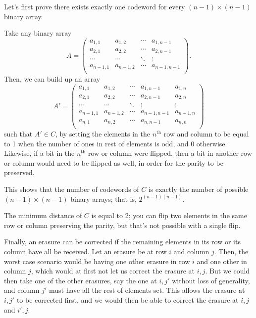 Let's first prove there exists exactly one codeword for every $(n-1)\times(n-1)$ binary array.

Take any binary array
\[A = \begin{pmatrix}
	a_{1,1} & a_{1,2} & \cdots & a_{1,n-1} \\
	a_{2,1} & a_{2,2} & \cdots & a_{2,n-1} \\
	\cdots & \cdots & \ddots & \vdots \\
	a_{n-1,1} & a_{n-1,2} & \cdots & a_{n-1,n-1} \\
\end{pmatrix}.\]
Then, we can build up an array
\[A' = \begin{pmatrix}
	a_{1,1} & a_{1,2} & \cdots & a_{1,n-1} & a_{1,n} \\
	a_{2,1} & a_{2,2} & \cdots & a_{2,n-1} & a_{2,n}\\
	\cdots & \cdots & \ddots & \vdots & \vdots \\
	a_{n-1,1} & a_{n-1,2} & \cdots & a_{n-1,n-1} & a_{n-1,n} \\
	a_{n,1} & a_{n,2} & \cdots & a_{n,n-1} & a_{n,n} \\
\end{pmatrix}\]
such that $A' \in C$, by setting the elements in the $n^\textrm{th}$ row and column to be equal to 1 when the number of ones in rest of elements is odd, and 0 otherwise. Likewise, if a bit in the $n^\textrm{th}$ row or column were flipped, then a bit in another row or column would need to be flipped as well, in order for the parity to be preserved.

This shows that the number of codewords of $C$ is exactly the number of possible $(n-1)\times(n-1)$ binary arrays; that is, $2^{(n-1)(n-1)}$.

The minimum distance of $C$ is equal to $2$; you can flip two elements in the same row or column preserving the parity, but that's not possible with a single flip.

Finally, an erasure can be corrected if the remaining elements in its row or its column have all be received. Let an erasure be at row $i$ and column $j$. Then, the worst case scenario would be having one other erasure in row $i$ and one other in column $j$, which would at first not let us correct the erasure at $i, j$. But we could then take one of the other erasures, say the one at $i, j'$ without loss of generality, and column $j'$ must have all the rest of elements set. This allows the erasure at $i, j'$ to be corrected first, and we would then be able to correct the erasure at $i, j$ and $i', j$.

